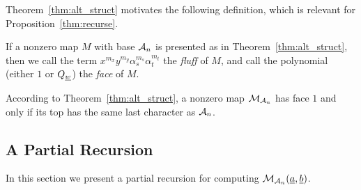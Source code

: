 Theorem~\ref{thm:alt_struct} motivates the following definition, which is relevant for Proposition~\ref{thm:recurse}.
\begin{definition}
	If a nonzero map $M$ with base $\AA_n$ is presented as in Theorem~\ref{thm:alt_struct}, then we call the term $x^{m_x}y^{m_y}\alpha_s^{m_s}\alpha_t^{m_t}$ the \emph{fluff} of $M$, and call the polynomial (either $1$ or $Q_{\ul w}$) the \emph{face} of $M$. 
\end{definition}
\begin{remark*}
	According to Theorem~\ref{thm:alt_struct}, a nonzero map $\MM_{\AA_n}$ has face $1$ and only if its top has the same last character as $\AA_n$.
\end{remark*}

\subsection{A Partial Recursion}
In this section we present a partial recursion for computing $\MM_{\AA_n}(\ul a, \ul b)$.  

